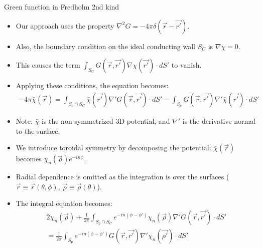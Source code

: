 \documentclass[8pt]{beamer}
\begin{document}
\begin{frame}{\color{white} Green function in Fredholm 2nd kind}
\begin{itemize}
    \item Our approach uses the property $\nabla^2G = -4\pi\delta(\vec{r} - \vec{r'})$.
    \item Also, the boundary condition on the ideal conducting wall $S_C$ is $\nabla \chi = 0$.
    \item This causes the term $\int_{S_C} G(\vec{r},\vec{r'}) \nabla \chi(\vec{r'}) \cdot dS'$ to vanish.
    \item Applying these conditions, the equation becomes:
    \begin{align}
         - 4\pi \bar{\chi}(\vec{r}) = \int_{S_p \cap S_C}  \bar{\chi}(\vec{r'}) \nabla' G(\vec{r},\vec{r'}) \cdot dS' - \int_{S_p} G(\vec{r},\vec{r'}) \nabla' \bar{\chi}(\vec{r'}) \cdot dS'
    \end{align}
    \item Note: $\bar{\chi}$ is the non-symmetrized 3D potential, and $\nabla'$ is the derivative normal to the surface.
    \item We introduce toroidal symmetry by decomposing the potential: $\bar{\chi}(\vec{r})$ becomes $\chi_n(\vec{\rho})e^{-in\phi}$.
    \item Radial dependence is omitted as the integration is over the surfaces ($\vec{r} \equiv \vec{r}(\theta,\phi)$, $\vec{\rho} \equiv \vec{\rho}(\theta)$).
    \item The integral equation becomes:
    \begin{align}
         2 \chi_n(\vec\rho) +\frac{1}{2\pi}\int_{S_p \cap S_C} e^{-in(\phi - \phi')}  \chi_n(\vec{\rho}) \nabla' G(\vec{r},\vec{r'}) \cdot dS' \nonumber \\
         = \frac{1}{2\pi} \int_{S_p} e^{-in(\phi - \phi')} G(\vec{r},\vec{r'}) \nabla' \chi_n(\vec{\rho'}) \cdot dS'
         \label{eq:21}
    \end{align}
\end{itemize}
\end{frame}
\end{document}
